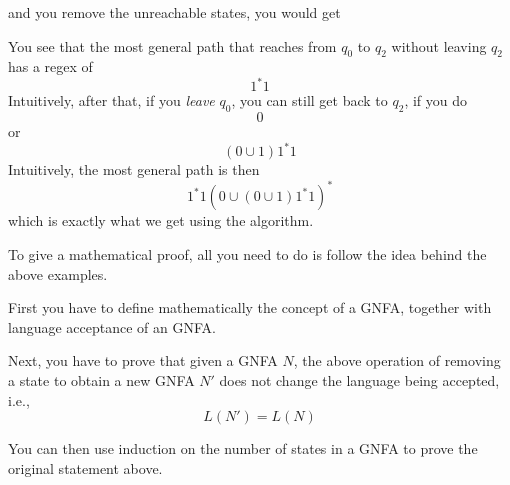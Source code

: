 \begin{center}
\end{center}
and you remove the unreachable states, you would get
\begin{center}
\end{center}
You see that the most general path that reaches from $q_0$
to $q_2$ without leaving $q_2$ has a regex of
\[
1^*1
\]
Intuitively, after that, 
if you \textit{leave} $q_0$, you can still get back to 
$q_2$, if you do
\[
0
\]
or
\[
(0 \cup 1)1^*1
\]
Intuitively, the most general path is then
\[
1^*1 (0 \cup (0 \cup 1)1^*1)^*
\]
which is exactly what we get using the algorithm.


\newpage
To give a mathematical proof, all you need to do is 
follow the idea behind the above examples.

First you have to define mathematically the concept of a GNFA, 
together with language acceptance of an GNFA.



Next, you have to prove that given a GNFA $N$,
the above operation of removing a state to obtain a new GNFA $N'$
does not change the language being accepted, i.e.,
\[
L(N') = L(N)
\]

You can then use induction on the number of states in a GNFA
to prove the original statement above.


